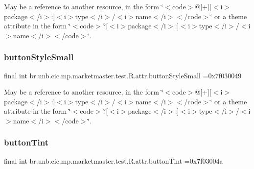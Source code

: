 May be a reference to another resource, in the form \char`\"{}$<$code$>$@\mbox{[}+\mbox{]}\mbox{[}$<$i$>$package$<$/i$>$\+:\mbox{]}$<$i$>$type$<$/i$>$/$<$i$>$name$<$/i$>$$<$/code$>$\char`\"{} or a theme attribute in the form \char`\"{}$<$code$>$?\mbox{[}$<$i$>$package$<$/i$>$\+:\mbox{]}$<$i$>$type$<$/i$>$/$<$i$>$name$<$/i$>$$<$/code$>$\char`\"{}. \mbox{\label{classbr_1_1unb_1_1cic_1_1mp_1_1marketmaster_1_1test_1_1R_1_1attr_ae568b405faa108daff8605f215ae5e83}} 
\subsubsection{\texorpdfstring{button\+Style\+Small}{buttonStyleSmall}}
{\footnotesize\ttfamily final int br.\+unb.\+cic.\+mp.\+marketmaster.\+test.\+R.\+attr.\+button\+Style\+Small =0x7f030049\hspace{0.3cm}{\ttfamily [static]}}

May be a reference to another resource, in the form \char`\"{}$<$code$>$@\mbox{[}+\mbox{]}\mbox{[}$<$i$>$package$<$/i$>$\+:\mbox{]}$<$i$>$type$<$/i$>$/$<$i$>$name$<$/i$>$$<$/code$>$\char`\"{} or a theme attribute in the form \char`\"{}$<$code$>$?\mbox{[}$<$i$>$package$<$/i$>$\+:\mbox{]}$<$i$>$type$<$/i$>$/$<$i$>$name$<$/i$>$$<$/code$>$\char`\"{}. \mbox{\label{classbr_1_1unb_1_1cic_1_1mp_1_1marketmaster_1_1test_1_1R_1_1attr_a21dadafeebd8c221d5552a7f6a6e6adb}} 
\subsubsection{\texorpdfstring{button\+Tint}{buttonTint}}
{\footnotesize\ttfamily final int br.\+unb.\+cic.\+mp.\+marketmaster.\+test.\+R.\+attr.\+button\+Tint =0x7f03004a\hspace{0.3cm}{\ttfamily [static]}}

